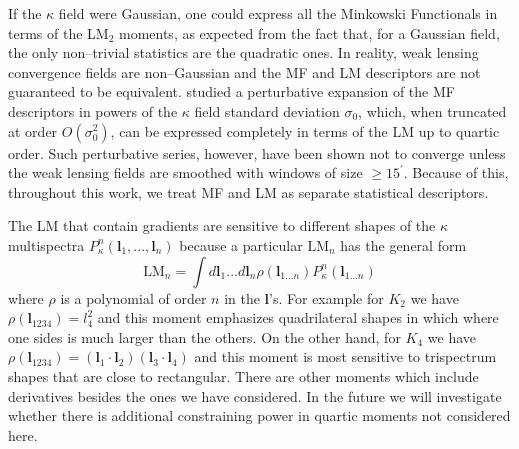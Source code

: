 \documentclass[reprint,aps,prd,superscriptaddress,showkeys,showpacs]{revtex4-1}
\begin{document}
If the $\kappa$ field were Gaussian, one could express all the Minkowski Functionals in terms of the LM$_2$ moments, as expected from the fact that, for a Gaussian field, the only non--trivial statistics are the quadratic ones. In reality, weak lensing convergence fields are non--Gaussian and the MF and LM descriptors are not guaranteed to be equivalent. \citep{Munshi12,Matsubara10} studied a perturbative expansion of the MF descriptors in powers of the $\kappa$ field standard deviation $\sigma_0$, which, when truncated at order $O(\sigma_0^2)$, can be expressed completely in terms of the LM up to quartic order. Such perturbative series, however, have been shown not to converge \citep{Petri2013} unless the weak lensing fields are smoothed with windows of size $\geq 15^\prime$. Because of this, throughout this work, we treat MF and LM as separate statistical descriptors. 

The LM that contain gradients are sensitive to different shapes of the $\kappa$ multispectra $P_{\kappa}^n(\mathbf{l}_1,...,\mathbf{l}_n)$ because a particular $\mathrm{LM}_n$ has the general form
%
\begin{equation}
\mathrm{LM}_n = \int d\mathbf{l}_1...d\mathbf{l}_n \rho(\mathbf{l}_{1...n})P^n_{\kappa}(\mathbf{l}_{1...n})
\end{equation}
%
where $\rho$ is a polynomial of order $n$ in the $\mathbf{l}$'s. For example for $K_2$ we have $\rho(\mathbf{l}_{1234})=l_4^2$ and this moment emphasizes quadrilateral shapes in which where one sides is much larger than the others. On the other hand, for $K_4$ we have $\rho(\mathbf{l}_{1234})=(\mathbf{l}_1\cdot\mathbf{l}_2)(\mathbf{l}_3\cdot\mathbf{l}_4)$ and this moment is most sensitive to trispectrum shapes that are close to rectangular. There are other moments which include derivatives besides the ones we have considered. In the future we will investigate whether there is additional constraining power in quartic moments not considered here.
\end{document}
